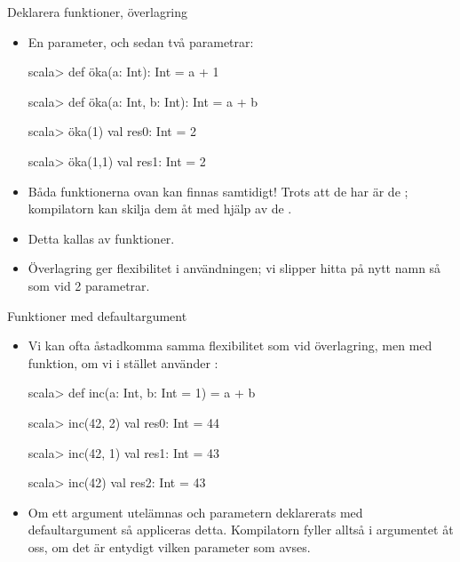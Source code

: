 \begin{Slide}{Deklarera funktioner, överlagring}
	\begin{itemize}
		\item En parameter, och sedan två parametrar:
		      \begin{REPL}
			      scala> def öka(a: Int): Int = a + 1

			      scala> def öka(a: Int, b: Int): Int = a + b

			      scala> öka(1)
			      val res0: Int = 2

			      scala> öka(1,1)
			      val res1: Int = 2

		      \end{REPL}
		\item Båda funktionerna ovan kan finnas samtidigt! Trots att de har  är de ; kompilatorn kan skilja dem åt med hjälp av de .

		\item Detta kallas   av funktioner.
		\item Överlagring ger flexibilitet i användningen; vi slipper hitta på nytt namn så som  vid 2 parametrar.
	\end{itemize}
\end{Slide}

\begin{Slide}{Funktioner med defaultargument}\SlideFontSmall

	\begin{itemize}
		\item Vi kan ofta åstadkomma samma flexibilitet som vid överlagring, men med  funktion, om vi i stället använder :
		      \begin{REPLnonum}
			      scala> def inc(a: Int, b: Int = 1) = a + b

			      scala> inc(42, 2)
			      val res0: Int = 44

			      scala> inc(42, 1)
			      val res1: Int = 43

			      scala> inc(42)
			      val res2: Int = 43

		      \end{REPLnonum}
		\item Om ett argument utelämnas och parametern deklarerats med defaultargument så appliceras detta. Kompilatorn fyller alltså i argumentet åt oss, om det är entydigt vilken parameter som avses.
	\end{itemize}
\end{Slide}


